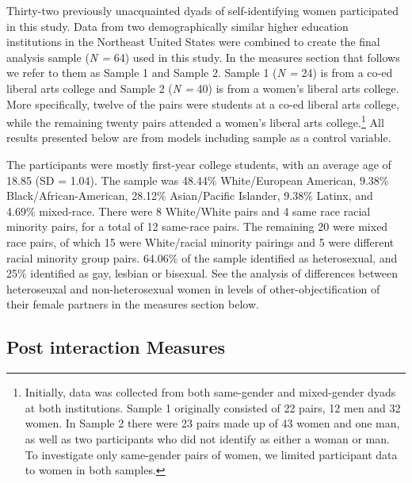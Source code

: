 \documentclass[man]{apa6}
\let\rmarkdownfootnote\footnote%
\def\footnote{\protect\rmarkdownfootnote}
\begin{document}
Thirty-two previously unacquainted dyads of self-identifying women
participated in this study. Data from two demographically similar higher
education institutions in the Northeast United States were combined to
create the final analysis sample (\emph{N =} 64) used in this study. In
the measures section that follows we refer to them as Sample 1 and
Sample 2. Sample 1 (\emph{N =} 24) is from a co-ed liberal arts college
and Sample 2 (\emph{N =} 40) is from a women's liberal arts college.
More specifically, twelve of the pairs were students at a co-ed liberal
arts college, while the remaining twenty pairs attended a women's
liberal arts college.\footnote{Initially, data was collected from both
  same-gender and mixed-gender dyads at both institutions. Sample 1
  originally consisted of 22 pairs, 12 men and 32 women. In Sample 2
  there were 23 pairs made up of 43 women and one man, as well as two
  participants who did not identify as either a woman or man. To
  investigate only same-gender pairs of women, we limited participant
  data to women in both samples.} All results presented below are from
models including sample as a control variable.

The participants were mostly first-year college students, with an
average age of 18.85 (SD = 1.04). The sample was 48.44\% White/European
American, 9.38\% Black/African-American, 28.12\% Asian/Pacific Islander,
9.38\% Latinx, and 4.69\% mixed-race. There were 8 White/White pairs and
4 same race racial minority pairs, for a total of 12 same-race pairs.
The remaining 20 were mixed race pairs, of which 15 were White/racial
minority pairings and 5 were different racial minority group pairs.
64.06\% of the sample identified as heterosexual, and 25\% identified as
gay, lesbian or bisexual. See the analysis of differences between
heteroseuxal and non-heterosexual women in levels of
other-objectification of their female partners in the measures section
below.

\subsection{Post interaction Measures}\label{post-interaction-measures}
\end{document}
